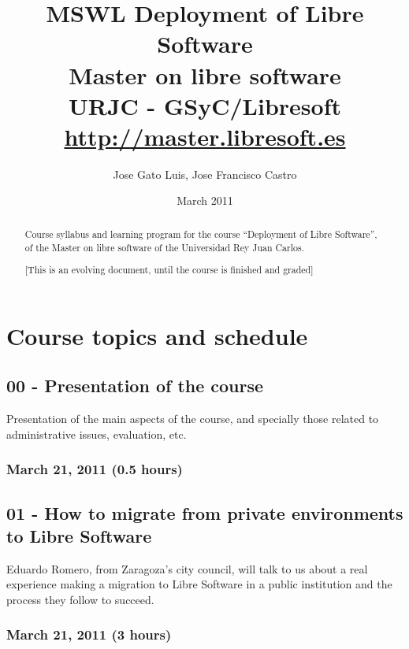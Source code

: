 \documentclass[a4paper]{article}
\title{MSWL Deployment of Libre Software \\
Master on libre software \\
URJC - GSyC/Libresoft \\
\url{http://master.libresoft.es}}
\author{Jose Gato Luis, Jose Francisco Castro}
\date{March 2011}
\begin{document}
\maketitle

\begin{abstract}
Course syllabus and learning program for the course ``Deployment of Libre Software'', of the Master on libre software of the
Universidad Rey Juan Carlos.

[This is an evolving document, until the course is finished and graded]
\end{abstract}

\tableofcontents

\section{Course topics and schedule}

\subsection{00 - Presentation of the course}

Presentation of the main aspects of the course, and specially those
related to administrative issues, evaluation, etc.

\subsubsection{March 21, 2011 (0.5 hours)}

\subsection{01 - How to migrate from private environments to Libre Software}

Eduardo Romero, from Zaragoza's city council, will talk to us about a real experience making a migration to Libre Software in a public institution and the process they follow to succeed. 

\subsubsection{March 21, 2011 (3 hours)}
\end{document}
